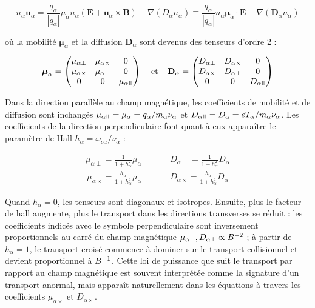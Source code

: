 \begin{refsection}
\begin{equation}
\label{1-eqDriftDif}
n_\alpha\mathbf u_\alpha=\frac{q_\alpha}{|q_\alpha|}\mu_\alpha
n_\alpha\left(\mathbf E+\mathbf u_\alpha\times\mathbf
B\right)-\nabla\left(D_\alpha n_\alpha\right)\equiv
\frac{q_\alpha}{|q_\alpha|} n_\alpha\boldsymbol{\mu}_\alpha\cdot \mathbf
E-{\nabla\left(\mathbf{D}_\alpha n_\alpha\right)}
\end{equation}

où la mobilité $\boldsymbol{\mu}_\alpha$ et la diffusion $\mathbf{D}_\alpha$
sont devenus des tenseurs d'ordre 2 :

\begin{align}
\boldsymbol{\mu}_\alpha =
 \begin{pmatrix}
  \mu_{\alpha\perp} & \mu_{\alpha\times} & 0 \\
  \mu_{\alpha\times} & \mu_{\alpha\perp} & 0 \\
  0  & 0  & \mu_{\alpha\para} 
 \end{pmatrix}\;\;\;\;\text{et}\;\;\;\;
 \mathbf D_\alpha =
 \begin{pmatrix}
  D_{\alpha\perp} & D_{\alpha\times} & 0 \\
  D_{\alpha\times} & D_{\alpha\perp} & 0 \\
  0  & 0  & D_{\alpha\para} 
 \end{pmatrix}
\end{align}

Dans la direction parallèle au champ magnétique, les coefficients de mobilité et
de diffusion sont inchangés
$\mu_{\alpha\para}=\mu_{\alpha}=q_\alpha/m_\alpha\nu_\alpha$ et
$D_{\alpha\para}=D_\alpha=eT_\alpha/m_\alpha\nu_\alpha$. Les coefficients de la
direction perpendiculaire font quant à eux apparaître le paramètre de Hall
$h_\alpha=\omega_{c\alpha}/\nu_\alpha$ :

\begin{align}
\mu_{\alpha\perp}=\frac{1}{1+h_\alpha^2}\mu_\alpha\;\;\;\;\;\;\;\;
\;\;\;\;D_{\alpha\perp}=\frac{1}{1+h_\alpha^2}D_\alpha
\end{align}
\begin{align}
\mu_{\alpha\times}=\frac{h_\alpha}{1+h_\alpha^2}\mu_\alpha\;\;\;\;
\;\;\;\;\;\;\;\;D_{\alpha\times}=\frac{h_\alpha}{1+h_\alpha^2}D_\alpha
\end{align}

Quand $h_\alpha=0$, les tenseurs sont diagonaux et isotropes. Ensuite, plus le
facteur de hall augmente, plus le transport dans les directions transverses se
réduit :
les coefficients indicés avec le symbole perpendiculaire sont inversement
proportionnels au carré du champ magnétique $\mu_{\alpha\perp},
D_{\alpha\perp}\propto B^{{-2}}$ ; à partir de $h_\alpha=1$, le
transport croisé commence à dominer sur le transport collisionnel et devient proportionnel à
$B^{{-1}}$. Cette loi de puissance que suit le transport par rapport au
champ magnétique est souvent interprétée comme la signature d'un transport
anormal, mais apparaît naturellement dans les équations à travers les
coefficients $\mu_{\alpha\times}$ et $D_{\alpha\times}$.



\end{refsection}
